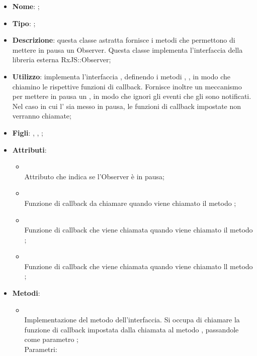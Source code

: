 \begin{itemize}
	\item \textbf{Nome}: ;
	\item \textbf{Tipo}: ;
	\item \textbf{Descrizione}: questa classe astratta fornisce i metodi che permettono di mettere in pausa un Observer.
Questa classe implementa l'interfaccia della libreria esterna RxJS::Observer;
	\item \textbf{Utilizzo}: implementa l'interfaccia , definendo i metodi , ,  in modo che chiamino le rispettive funzioni di callback. Fornisce inoltre un meccanismo per mettere in pausa un , in modo che ignori gli eventi che gli sono notificati. Nel caso in cui l' sia messo in pausa, le funzioni di callback impostate non verranno chiamate;
	\item \textbf{Figli}: , , ;
	\item \textbf{Attributi}:
	\begin{itemize}
		\item[]  \\
		Attributo che indica se l'Observer è in pausa;
		\item[]  \\
		Funzione di callback da chiamare quando viene chiamato il metodo ;
		\item[]  \\
		Funzione di callback che viene chiamata quando viene chiamato il metodo ;
		\item[]  \\
		Funzione di callback che viene chiamata quando viene chiamato ll metodo ;
	\end{itemize}
	\item \textbf{Metodi}:
	\begin{itemize}
		\item[]  \\
		Implementazione del metodo dell'interfaccia. Si occupa di chiamare la funzione di callback impostata dalla chiamata al metodo , passandole come parametro ;\\
		Parametri:
		\begin{itemize}

\end{itemize}
\end{itemize}
\end{itemize}
